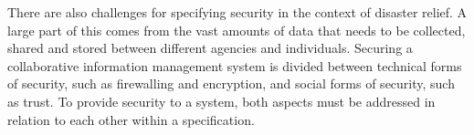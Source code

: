 \documentclass[sigconf,nonacm]{acmart}%
\begin{document}
	There are also challenges for specifying security in the context of disaster relief. A large part of this comes from the vast amounts of data that needs to be collected, shared and stored between different agencies and individuals. Securing a collaborative information management system is divided between technical forms of security, such as firewalling and encryption, and social forms of security, such as trust. To provide security to a system, both aspects must be addressed in relation to each other within a specification. 	
	
\end{document}
